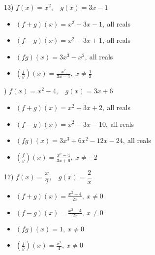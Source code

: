 \documentclass[11pt]{book}
\theoremstyle{definition}  %
\begin{document}
13) $f(x)=x^2,~~~~g(x)=3x-1$ 
\scriptsize
\begin{multicols}{2}
\begin{itemize}
\item  $(f+g)(x)=x^2+3x-1,~$all reals
\item  $(f-g)(x)=x^2-3x+1,~$all reals
\end{itemize}
\end{multicols}
\begin{multicols}{2}
\begin{itemize}
\item  $(fg)(x)=3x^3-x^2,~$all reals
\item  $\left(\frac{f}{g}\right)(x)=\frac{x^2}{3x-1},~x\neq\frac{1}{3}$
\end{itemize}
\end{multicols}
\normalsize

) $f(x)=x^2-4,~~~~g(x)=3x+6$ 
\scriptsize
\begin{multicols}{2}
\begin{itemize}
\item  $(f+g)(x)=x^2+3x+2,~$all reals
\item  $(f-g)(x)=x^2-3x-10,~$all reals
\end{itemize}
\end{multicols}
\begin{multicols}{2}
\begin{itemize}
\item  $(fg)(x)=3x^3+6x^2-12x-24,~$all reals
\item  $\left(\frac{f}{g}\right)(x)=\frac{x^2-4}{3x+6},~x\neq -2$
\end{itemize}
\end{multicols}
\normalsize

17) $f(x)=\dfrac{x}{2},~~~~g(x)=\dfrac{2}{x}$ 
\scriptsize
\begin{multicols}{2}
\begin{itemize}
\item  $(f+g)(x)=\frac{x^2+4}{2x},~x\neq 0$
\item  $(f-g)(x)=\frac{x^2-4}{2x},~x\neq 0$
\end{itemize}
\end{multicols}
\begin{multicols}{2}
\begin{itemize}
\item  $(fg)(x)=1,~x\neq 0$
\item  $\left(\frac{f}{g}\right)(x)=\frac{x^2}{4},~x\neq 0$
\end{itemize}
\end{multicols}
\normalsize
\end{document}
